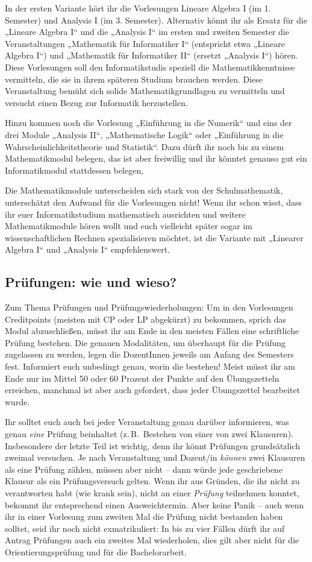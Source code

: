 In der ersten Variante hört ihr die Vorlesungen Lineare Algebra I (im 1. Semester) und Analysis I (im 3. Semester). Alternativ könnt ihr als Ersatz für die „Lineare Algebra I“ und die „Analysis I“ im ersten und zweiten Semester die Veranstaltungen „Mathematik für Informatiker I“ (entspricht etwa „Lineare Algebra I“) und „Mathematik für Informatiker II“ (ersetzt „Analysis I“) hören. Diese Vorlesungen soll den Informatikstudis speziell die Mathematikkenntnisse vermitteln, die sie in ihrem späteren Studium brauchen werden. Diese Veranstaltung bemüht sich solide Mathematikgrundlagen zu vermitteln und versucht einen Bezug zur Informatik herzustellen.

Hinzu kommen noch die Vorlesung „Einführung in die Numerik“ und eins der drei Module „Analysis II“, „Mathematische Logik“ oder „Einführung in die Wahrscheinlichkeitstheorie und Statistik“. Dazu dürft ihr noch bis zu einem Mathematikmodul belegen, das ist aber freiwillig und ihr könntet genauso gut ein Informatikmodul stattdessen belegen,

Die Mathematikmodule unterscheiden sich stark von der Schulmathematik, unterschätzt den Aufwand für die Vorlesungen nicht! Wenn ihr schon wisst, dass ihr euer Informatikstudium mathematisch ausrichten und weitere Mathematikmodule hören wollt und euch vielleicht später sogar im wissenschaftlichen Rechnen spezialisieren möchtet, ist die Variante mit „Linearer Algebra I“ und „Analysis I“ empfehlenswert.


\subsection{Prüfungen: wie und wieso?}

Zum Thema Prüfungen und Prüfungswiederholungen: Um in den Vorlesungen Creditpoints (meisten mit \gls{CP} oder \gls{LP} abgekürzt) zu bekommen, sprich das Modul abzuschließen, müsst ihr am Ende in den meisten Fällen eine schriftliche Prüfung bestehen. Die genauen Modalitäten, um überhaupt für die Prüfung zugelassen zu werden, legen die DozentInnen jeweils am Anfang des Semesters fest. Informiert euch unbedingt genau, worin die bestehen! Meist müsst ihr am Ende nur im Mittel 50 oder 60 Prozent der Punkte auf den Übungszetteln erreichen, manchmal ist aber auch gefordert, dass jeder Übungszettel bearbeitet wurde.

Ihr solltet euch auch bei jeder Veranstaltung genau darüber informieren, was genau \emph{eine} Prüfung beinhaltet (z.\,B.\ Bestehen von einer von zwei Klausuren). Insbesondere der letzte Teil ist wichtig, denn ihr könnt Prüfungen grundsätzlich zweimal versuchen. Je nach Veranstaltung und Dozent/in \emph{können} zwei Klausuren als eine Prüfung zählen, müssen aber nicht -- dann würde jede geschriebene Klausur als ein Prüfungsversuch gelten. Wenn ihr aus Gründen, die ihr nicht zu verantworten habt (wie krank sein), nicht an einer \emph{Prüfung} teilnehmen konntet, bekommt ihr entsprechend einen Ausweichtermin. Aber keine Panik -- auch wenn ihr in einer Vorlesung zum zweiten Mal die Prüfung nicht bestanden haben solltet, seid ihr noch nicht exmatrikuliert: In bis zu vier Fällen dürft ihr auf Antrag Prüfungen auch ein zweites Mal wiederholen, dies gilt aber nicht für die Orientierungsprüfung und für die Bachelorarbeit.


